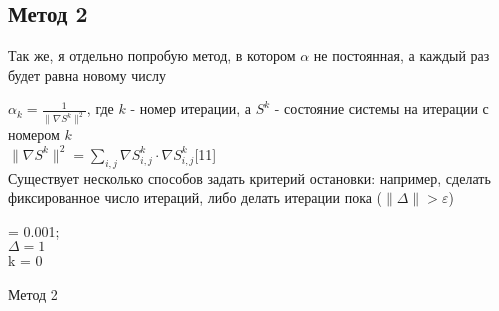 \documentclass[ 12pt,x11names]{article}
\begin{document}
    \subsection{Метод 2}
    Так же, я  отдельно попробую метод, в котором  $\alpha$ не постоянная, а каждый раз будет равна новому числу
    \begin{comment}
     $\alpha_k  = \frac{\| \nabla S^k \|^2}{\| \nabla S^{k-1} \|^2}$,
     \end{comment}
     $\alpha_k  = \frac{1}{\| \nabla S^k \|^2}$, где $k$ - номер итерации, а $S^k$ - состояние системы на итерации с номером $k$\\
     $\| \nabla S^k \|^2  = \displaystyle{\sum_{i, j}}  \nabla S^k_{i,j} \cdot  \nabla S^k_{i,j}$[11]\\
    Существует несколько способов задать критерий остановки: например, сделать фиксированное число итераций, либо делать итерации пока  ($\| \Delta \|> \varepsilon$)\\
    \begin{comment}
		     $\alpha  = \frac{\| \nabla S^k \|^2}{\| \nabla S^{k-1} \|^2}$\\
    \end{comment}
    \begin{algorithm}[H]
		\SetAlgoLined
		\alpha = 0.001;\\
		$ \Delta  = 1$\\
		k = 0\\
	\caption{Метод 2}
    \end{algorithm}
\end{document}
